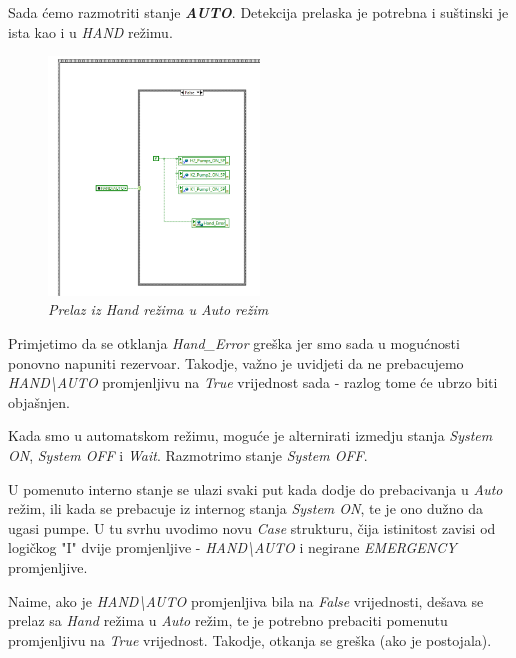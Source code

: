 \documentclass[12pt, titlepage]{article}
\begin{document}
                \newpage

                Sada ćemo razmotriti stanje \textbf{\textit{AUTO}}. Detekcija prelaska je potrebna i 
                suštinski je ista kao i u \textit{HAND} režimu.

                \begin{figure}[ht]
                    \centering
                    \includegraphics[width=0.5\textwidth]{Slike/HAND_AUTO.vi HAND TO AUTO.png}
                    \caption{\textit{Prelaz iz Hand režima u Auto režim}}
                \end{figure}

                Primjetimo da se otklanja \textit{Hand\_Error} greška jer smo sada u mogućnosti 
                ponovno napuniti rezervoar. Takodje, važno je uvidjeti da ne prebacujemo 
                \textit{HAND\textbackslash{}AUTO} promjenljivu na \textit{True} vrijednost sada -
                razlog tome će ubrzo biti objašnjen.

                Kada smo u automatskom režimu, moguće je alternirati izmedju stanja \textit{System ON}, 
                \textit{System OFF} i \textit{Wait}. Razmotrimo stanje \textit{System OFF}.

                U pomenuto interno stanje se ulazi svaki put kada dodje do prebacivanja u \textit{Auto}
                režim, ili kada se prebacuje iz internog stanja \textit{System ON}, te je ono dužno da ugasi pumpe.
                U tu svrhu uvodimo novu \textit{Case} strukturu, čija istinitost zavisi od logičkog "I"
                dvije promjenljive - \textit{HAND\textbackslash{}AUTO} i negirane \textit{EMERGENCY} 
                promjenljive.

                Naime, ako je \textit{HAND\textbackslash{}AUTO} promjenljiva bila na \textit{False} 
                vrijednosti, dešava se prelaz sa \textit{Hand} režima u \textit{Auto} režim,
                te je potrebno prebaciti pomenutu promjenljivu na \textit{True} vrijednost.
                Takodje, otkanja se greška (ako je postojala). 
\end{document}
